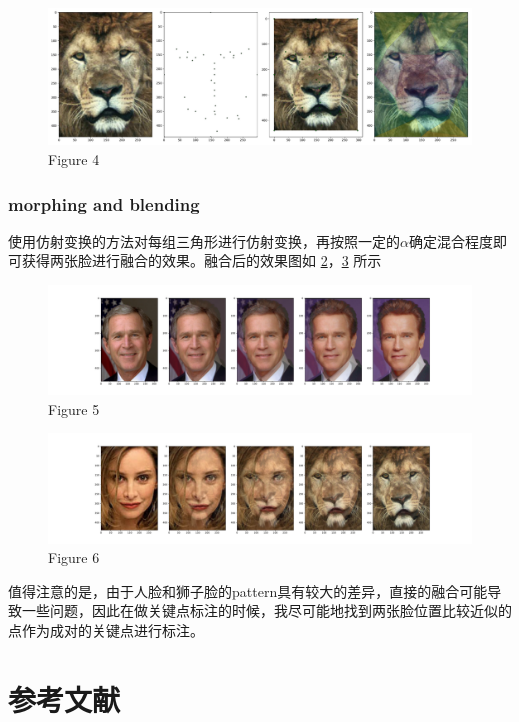 \documentclass[a4paper]{article}
\begin{document}
\begin{figure}[htp]
\centering
\includegraphics[width=1\linewidth]{pictures/4.pdf}
\caption{Figure 4}
\label{fig:4}
\end{figure}

\subsubsection{morphing and blending}
使用仿射变换的方法对每组三角形进行仿射变换，再按照一定的$\alpha$确定混合程度即可获得两张脸进行融合的效果。融合后的效果图如 \ref{fig:5}，\ref{fig:6} 所示

\begin{figure}[htp]
\centering
\includegraphics[width=1\linewidth]{pictures/5.pdf}
\caption{Figure 5}
\label{fig:5}
\end{figure}

\begin{figure}[htp]
\centering
\includegraphics[width=1\linewidth]{pictures/6.pdf}
\caption{Figure 6}
\label{fig:6}
\end{figure}

值得注意的是，由于人脸和狮子脸的pattern具有较大的差异，直接的融合可能导致一些问题，因此在做关键点标注的时候，我尽可能地找到两张脸位置比较近似的点作为成对的关键点进行标注。

\section{参考文献}
\end{document}
